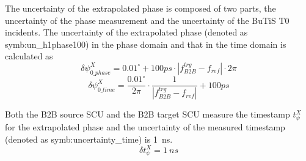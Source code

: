 The uncertainty of the extrapolated phase is composed of two parts, the uncertainty of the phase measurement and the uncertainty of the BuTiS T0 incidents. The uncertainty of the extrapolated phase (denoted as \gls{symb:un_h1phase100}) in the phase domain and that in the time domain is calculated as 
\begin{equation} 
\delta \psi^{X}_\mathit{0\_phase}=0.01^\circ+100ps \cdot |f_\mathit{B2B}^\mathit{trg}-f_\mathit{ref}| \cdot {2\pi}
\label{jitter_measure_p}
\end{equation}
\begin{equation} 
\delta \psi^{X}_\mathit{0\_time}=\frac{0.01^\circ}{2\pi}\cdot \frac{1}{|f_\mathit{B2B}^\mathit{trg}-f_\mathit{ref}|}+100ps 
\label{jitter_measure_p}
\end{equation}


Both the B2B source SCU and the B2B target SCU measure the timestamp $t_\psi^X$ for the extrapolated phase and the uncertainty of the measured timestamp (denoted as \gls{symb:uncertainty_time}) is \SI{1}{ns}.  
\begin{equation} 
\delta t_\psi^X= \SI{1}{ns}
\label{jitter_measure_t}
\end{equation}

